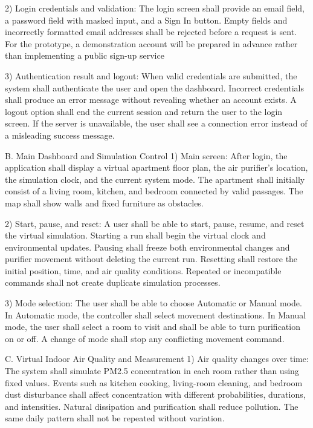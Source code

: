 2) Login credentials and validation:
The login screen shall provide an email field, a password field with masked input, and a Sign In button. Empty fields and incorrectly formatted email addresses shall be rejected before a request is sent. For the prototype, a demonstration account will be prepared in advance rather than implementing a public sign-up service

3) Authentication result and logout:
When valid credentials are submitted, the system shall authenticate the user and open the dashboard. Incorrect credentials shall produce an error message without revealing whether an account exists. A logout option shall end the current session and return the user to the login screen. If the server is unavailable, the user shall see a connection error instead of a misleading success message.

B.	Main Dashboard and Simulation Control
1) Main screen:
After login, the application shall display a virtual apartment floor plan, the air purifier's location, the simulation clock, and the current system mode. The apartment shall initially consist of a living room, kitchen, and bedroom connected by valid passages. The map shall show walls and fixed furniture as obstacles.

2) Start, pause, and reset:
A user shall be able to start, pause, resume, and reset the virtual simulation. Starting a run shall begin the virtual clock and environmental updates. Pausing shall freeze both environmental changes and purifier movement without deleting the current run. Resetting shall restore the initial position, time, and air quality conditions. Repeated or incompatible commands shall not create duplicate simulation processes.

3) Mode selection:
The user shall be able to choose Automatic or Manual mode. In Automatic mode, the controller shall select movement destinations. In Manual mode, the user shall select a room to visit and shall be able to turn purification on or off. A change of mode shall stop any conflicting movement command.

C. Virtual Indoor Air Quality and Measurement
1) Air quality changes over time:
The system shall simulate PM2.5 concentration in each room rather than using fixed values. Events such as kitchen cooking, living-room cleaning, and bedroom dust disturbance shall affect concentration with different probabilities, durations, and intensities. Natural dissipation and purification shall reduce pollution. The same daily pattern shall not be repeated without variation.

